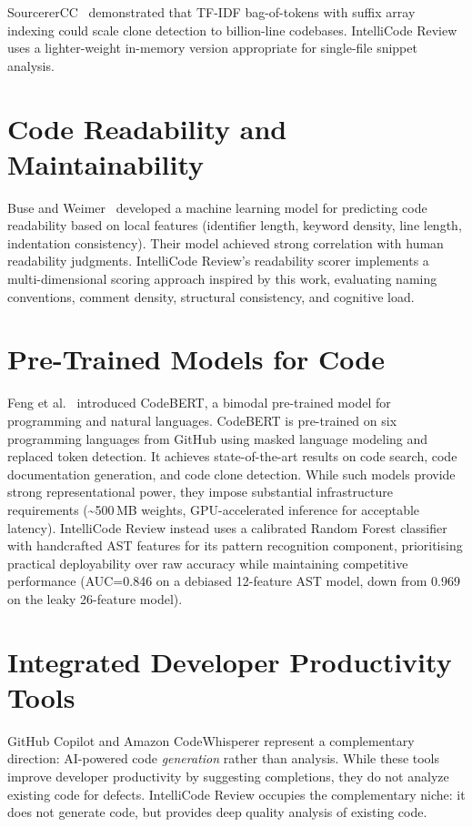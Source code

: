 \documentclass[12pt, oneside]{report}
\begin{document}
SourcererCC~\cite{sajnani2016} demonstrated that TF-IDF bag-of-tokens with suffix array
indexing could scale clone detection to billion-line codebases. IntelliCode Review uses a
lighter-weight in-memory version appropriate for single-file snippet analysis.

\section{Code Readability and Maintainability}
\label{sec:rel-readability}

Buse and Weimer~\cite{buse2010} developed a machine learning model for predicting code
readability based on local features (identifier length, keyword density, line length,
indentation consistency). Their model achieved strong correlation with human readability
judgments. IntelliCode Review's readability scorer implements a multi-dimensional scoring
approach inspired by this work, evaluating naming conventions, comment density, structural
consistency, and cognitive load.

\section{Pre-Trained Models for Code}
\label{sec:rel-pretrained}

Feng et al.~\cite{feng2020} introduced CodeBERT, a bimodal pre-trained model for
programming and natural languages. CodeBERT is pre-trained on six programming languages
from GitHub using masked language modeling and replaced token detection. It achieves
state-of-the-art results on code search, code documentation generation, and code clone
detection. While such models provide strong representational power, they impose substantial
infrastructure requirements (\textasciitilde500\,MB weights, GPU-accelerated inference for
acceptable latency). IntelliCode Review instead uses a calibrated Random Forest classifier
with handcrafted AST features for its pattern recognition component, prioritising practical
deployability over raw accuracy while maintaining competitive performance (AUC=0.846
on a debiased 12-feature AST model, down from 0.969 on the leaky 26-feature model).

\section{Integrated Developer Productivity Tools}
\label{sec:rel-idt}

GitHub Copilot and Amazon CodeWhisperer represent a complementary direction: AI-powered
code \textit{generation} rather than analysis. While these tools improve developer
productivity by suggesting completions, they do not analyze existing code for defects.
IntelliCode Review occupies the complementary niche: it does not generate code, but
provides deep quality analysis of existing code.
\end{document}
